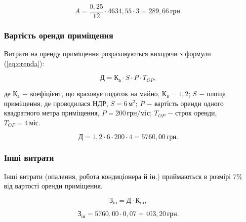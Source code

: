 \[
A = \frac{0,25}{12} \cdot 4634,55 \cdot 3 = 289,66 \, \text{грн}.
\]

\vspace{1.5em}

\subsubsection{Вартість оренди приміщення}

Витрати на оренду примiщення розраховуються виходячи з формули (\ref{eq:orenda}):

\begin{equation}\label{eq:orenda}
\text{Д} = \text{К}_{\text{а}} \cdot S \cdot P \cdot T_{OP},
\end{equation}

\noindent де $\text{К}_{\text{а}}$ $-$ коефіцієнт, що враховує податок на майно, $\text{К}_{\text{а}} = 1,2$;\newline
\hspace*{19pt}$S$ $-$ площа приміщення, де проводилася НДР, $S = 6 \, \text{м}^{2}$;\newline
\hspace*{19pt}$P$ $-$ вартість оренди одного квадратного метра приміщення,\newline
\hspace*{19pt}$P = 200 \, \text{грн}/\text{міс}$;\newline
\hspace*{19pt}$T_{OP}$ $-$ строк оренди, $T_{OP} = 4 \, \text{міс}$.

\[
\text{Д} = 1,2 \cdot 6 \cdot 200 \cdot 4 = 5760,00 \, \text{грн}.
\]

\vspace{1.5em}

\subsubsection{Інші витрати}

Інші витрати (опалення, робота кондиціонера й ін.) приймаються в розмірі $7\%$ від вартості оренди приміщення. 



\begin{equation}\label{eq:inshe}
\text{З}_{\text{ін}} = \text{Д} \cdot \text{К}_{\text{ін}},
\end{equation}

\[
\text{З}_{\text{ін}} = 5760,00 \cdot 0,07 = 403,20 \, \text{грн}. 
\]

\vspace{1.5em}

